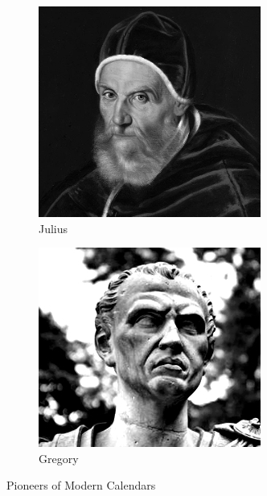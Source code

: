 \documentclass[12pt]{article}
\begin{document}
    \begin{figure}[h]
        \centering
        \begin{subfigure}[b]{0.4\textwidth}
            \centering
            \includegraphics[width=\textwidth]{gregory.PNG} %
            \caption{Julius}
            \label{fig:fig1}
        \end{subfigure}
        \hspace{.1cm}
        \begin{subfigure}[b]{0.4\textwidth}
            \centering
            \includegraphics[width=\textwidth]{julius.jpg} %
            \caption{Gregory}
            \label{fig:fig2}
        \end{subfigure}
        \caption{Pioneers of Modern Calendars}
        \label{fig:calendars}
    \end{figure}
\end{document}
